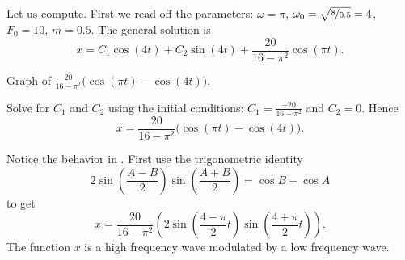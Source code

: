 \begin{exampleSol}
Let us compute.  First we read off the parameters:
$\omega = \pi$, $\omega_0 = \sqrt{\nicefrac{8}{0.5}} = 4$, $F_0 = 10$,
$m=0.5$.  The general solution is
\begin{equation*}
x = C_1 \cos (4 t) + C_2 \sin (4 t) +
\frac{20}{16 - \pi^2} \cos (\pi t) .
\end{equation*}

\begin{mywrapfig}[15]{3.25in}
\capstart
{}
\caption{Graph of
$\frac{20}{16 - \pi^2} \bigl( \cos (\pi t)- \cos (4 t) \bigr)$.\label{3.6:beatingfig}}
\end{mywrapfig}
%
%


Solve for $C_1$ and $C_2$ using the initial conditions:
$C_1 = \frac{-20}{16 - \pi^2}$ and $C_2 = 0$.  Hence
\begin{equation*}
x = 
\frac{20}{16 - \pi^2} \bigl( \cos (\pi t)- \cos (4 t) \bigr) .
\end{equation*}


Notice the  behavior
in .  First
use the 
trigonometric identity
\begin{equation*}
2\sin \left( \frac{A-B}{2} \right) \sin \left( \frac{A+B}{2} \right) =
\cos B -\cos A 
\end{equation*}
to get 
\begin{equation*}
x = 
\frac{20}{16 - \pi^2} \left( 2 \sin \left(\frac{4-\pi}{2} t \right)
\sin \left( \frac{4+\pi}{2} t \right) \right) .
\end{equation*}
The function $x$ is a high frequency wave modulated by a low frequency
wave.
\end{exampleSol}

